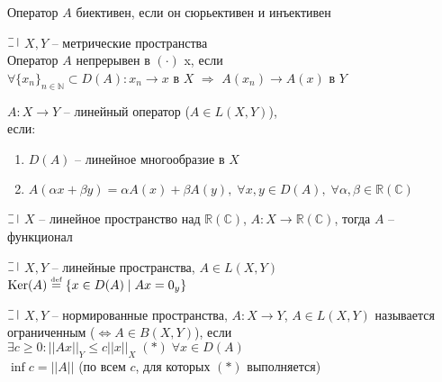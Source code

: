 \begin{definition}
  Оператор $A$ биективен, если он сюрьективен и инъективен
\end{definition}

\begin{definition}
  $\letus$ $X, Y$ -- метрические пространства\\
  Оператор $A$ непрерывен в $(\cdot)$ x, если\\
  $\forall \{x_n\}_{n \in \mathbb{N}} \subset D(A): x_n \rightarrow x$ в $X$ $\Longrightarrow$ $A(x_n) \rightarrow A(x)$ в $Y$
\end{definition}

\begin{definition}
  $A: X \longrightarrow Y$ -- линейный оператор ($A \in L(X, Y)$), \\ если: 
  \begin{minipage}[t]{0.8\linewidth}\begin{enumerate}[itemsep=1mm]
    \item $D(A)$ -- линейное многообразие в $X$
    \item $A(\alpha x + \beta y) = \alpha A(x) + \beta A(y), \; 
    \forall x, y \in D(A), \; \forall \alpha, \beta \in \mathbb{R}(\mathbb{C})$
  \end{enumerate}\end{minipage}
\end{definition}

\begin{definition}[Функционал]
  $\letus$ $X$ -- линейное пространство над $\mathbb{R}(\mathbb{C})$, $A: X \longrightarrow \mathbb{R}(\mathbb{C})$,
  тогда $A$ -- функционал  
\end{definition}

\begin{definition}
  $\letus$ $X, Y$ -- линейные пространства, $A \in L(X, Y)$\\
  $\text{Ker}(A) \overset{\text{\tiny def}}= \{x \in D(A) \mid Ax = 0_y\}$
\end{definition}

\begin{definition}
  $\letus$ $X, Y$ -- нормированные пространства, $A: X \longrightarrow Y$, $A \in L(X, Y)$ называется ограниченным ($\Leftrightarrow A\in B(X, Y)$), если
  $\exists c \ge 0: ||Ax||_Y \le c ||x||_X \; (*) \; \forall x \in D(A)$\\
  $\inf c = ||A||$ (по всем $c$, для которых $(*)$ выполняется)
\end{definition}
  
